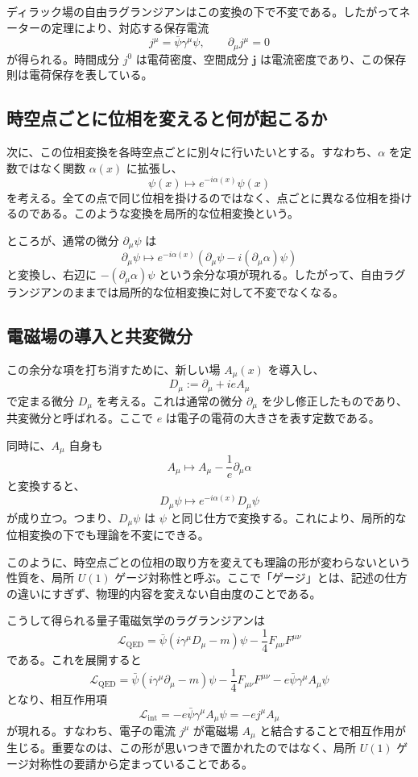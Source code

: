 ディラック場の自由ラグランジアンはこの変換の下で不変である。したがってネーターの定理により、対応する保存電流
\[
j^\mu = \bar{\psi}\gamma^\mu \psi,
\qquad
\partial_\mu j^\mu = 0
\]
が得られる。時間成分 $j^0$ は電荷密度、空間成分 $\mathbf{j}$ は電流密度であり、この保存則は電荷保存を表している。

\subsection{時空点ごとに位相を変えると何が起こるか}
次に、この位相変換を各時空点ごとに別々に行いたいとする。すなわち、$\alpha$ を定数ではなく関数 $\alpha(x)$ に拡張し、
\[
\psi(x)\mapsto e^{-i\alpha(x)}\psi(x)
\]
を考える。全ての点で同じ位相を掛けるのではなく、点ごとに異なる位相を掛けるのである。このような変換を局所的な位相変換という。

ところが、通常の微分 $\partial_\mu \psi$ は
\[
\partial_\mu \psi \mapsto e^{-i\alpha(x)}
\left(\partial_\mu \psi - i(\partial_\mu \alpha)\psi\right)
\]
と変換し、右辺に $-(\partial_\mu\alpha)\psi$ という余分な項が現れる。したがって、自由ラグランジアンのままでは局所的な位相変換に対して不変でなくなる。

\subsection{電磁場の導入と共変微分}
この余分な項を打ち消すために、新しい場 $A_\mu(x)$ を導入し、
\[
D_\mu := \partial_\mu + ieA_\mu
\]
で定まる微分 $D_\mu$ を考える。これは通常の微分 $\partial_\mu$ を少し修正したものであり、共変微分と呼ばれる。ここで $e$ は電子の電荷の大きさを表す定数である。

同時に、$A_\mu$ 自身も
\[
A_\mu \mapsto A_\mu - \frac{1}{e}\partial_\mu \alpha
\]
と変換すると、
\[
D_\mu \psi \mapsto e^{-i\alpha(x)}D_\mu \psi
\]
が成り立つ。つまり、$D_\mu\psi$ は $\psi$ と同じ仕方で変換する。これにより、局所的な位相変換の下でも理論を不変にできる。

このように、時空点ごとの位相の取り方を変えても理論の形が変わらないという性質を、局所 $U(1)$ ゲージ対称性と呼ぶ。ここで「ゲージ」とは、記述の仕方の違いにすぎず、物理的内容を変えない自由度のことである。

こうして得られる量子電磁気学のラグランジアンは
\[
\mathcal{L}_{\mathrm{QED}}
=
\bar{\psi}(i\gamma^\mu D_\mu - m)\psi
- \frac{1}{4}F_{\mu\nu}F^{\mu\nu}
\]
である。これを展開すると
\[
\mathcal{L}_{\mathrm{QED}}
=
\bar{\psi}(i\gamma^\mu \partial_\mu - m)\psi
- \frac{1}{4}F_{\mu\nu}F^{\mu\nu}
- e\bar{\psi}\gamma^\mu A_\mu \psi
\]
となり、相互作用項
\[
\mathcal{L}_{\mathrm{int}} = - e\bar{\psi}\gamma^\mu A_\mu \psi = -e j^\mu A_\mu
\]
が現れる。すなわち、電子の電流 $j^\mu$ が電磁場 $A_\mu$ と結合することで相互作用が生じる。重要なのは、この形が思いつきで置かれたのではなく、局所 $U(1)$ ゲージ対称性の要請から定まっていることである。

